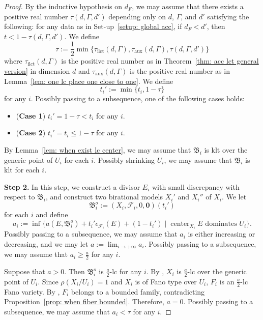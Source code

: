 \documentclass[11pt,reqno]{amsart}
\numberwithin{equation}{section}
\newcommand{\Center}{\operatorname{center}}
\newcommand{\ilct}{\operatorname{ilct}}
\newcommand{\aux}{\operatorname{aux}}
\newcommand{\Bb}{{\mathfrak{B}}}
\newcommand{\Ff}{\mathcal{F}}
\newcommand{\Ii}{\Gamma}
\theoremstyle{definition}
\begin{document}
\begin{proof}
By the inductive hypothesis on $d_F$, we may assume that there exists a positive real number $\tau(d,\Ii,d')$ depending only on $d$, $\Ii$, and $d'$ satisfying the following: for any data as in Set-up~\ref{setup: global acc}, if $d_F<d'$, then $t<1-\tau(d,\Ii,d')$. We define
$$\tau:=\frac{1}{2}\min\{\tau_{\ilct}(d,\Ii),\tau_{\aux}(d,\Ii),\tau(d,\Ii,d')\}$$
where $\tau_{\ilct}(d,\Ii)$ is the positive real number as in Theorem~\ref{thm: acc lct general version} in dimension $d$ and $\tau_{\aux}(d,\Ii)$ is the positive real number as in Lemma~\ref{lem: one lc place one close to one}. We define
$$t_i':=\min\{t_i,1-\tau\}$$
for any $i$. Possibly passing to a subsequence, one of the following cases holds:
\begin{itemize}
    \item (\textbf{Case 1}) $t_i'=1-\tau<t_i$ for any $i$.
    \item (\textbf{Case 2}) $t_i'=t_i\leq 1-\tau$ for any $i$.
\end{itemize}
By Lemma~\ref{lem: when exist lc center}, we may assume that $\Bb_i$ is klt over the generic point of $U_i$ for each $i$. Possibly shrinking $U_i$, we may assume that $\Bb_i$ is klt for each $i$.

\medskip

\noindent\textbf{Step 2.} In this step, we construct a divisor $E_i$ with small discrepancy with respect to $\Bb_i$, and construct two birational models $X_i'$ and $X_i''$ of $X_i$. We let 
$$\Bb_i^o:=(X_i,\Ff_i,0,\bm{0})(t_i')$$
for each $i$ and define
$$a_i:=\inf\{a(E,\Bb_i^o)+t_i'\epsilon_{\Ff_i}(E)+(1-t_i')\mid\Center_{X_i}E\text{ dominates }U_i\}.$$
Possibly passing to a subsequence, we may assume that $a_i$ is either increasing or decreasing, and we may let $a:=\lim_{i\rightarrow+\infty}a_i$. Possibly passing to a subsequence, we may assume that $a_i\geq\frac{a}{2}$ for any $i$. 

Suppose that $a>0$. Then $\Bb_i^o$ is $\frac{a}{2}$-lc for any $i$. By \cite[Proposition~9.1]{Cas+25a}, $X_i$ is $\frac{a}{2}$-lc over the generic point of $U_i$. Since $\rho(X_i/U_i)=1$ and $X_i$ is of Fano type over $U_i$, $F_i$ is an $\frac{a}{2}$-lc Fano variety. By \cite[Theorem~1.1]{Bir21a}, $F_i$ belongs to a bounded family, contradicting Proposition~\ref{prop: when fiber bounded}. Therefore, $a=0$. Possibly passing to a subsequence, we may assume that $a_i<\tau$ for any $i$. 


\end{proof}
\end{document}

